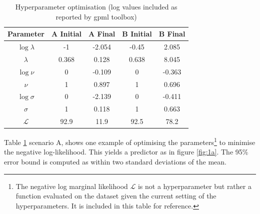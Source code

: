 \documentclass[]{article}
\newcommand{\Lcal}{\mathcal{L}}
\begin{document}
\begin{table}[!h]
\centering
\begin{tabular}{c | c c | c c}
	\textbf{Parameter} & \textbf{A Initial} & \textbf{A Final} & \textbf{B Initial} & \textbf{B Final} \\ \hline
	$\log \lambda$           & -1                 & -2.054           & -0.45              & 2.085            \\
	$\lambda$                & 0.368              & 0.128            & 0.638              & 8.045            \\
	$\log \nu$         & 0                  & -0.109           & 0                  & -0.363           \\
	$\nu$              & 1                  & 0.897            & 1                  & 0.696            \\
	$\log \sigma$      & 0                  & -2.139           & 0                  & -0.411   \\
	$\sigma$           & 1                  & 0.118            & 1                  & 0.663    \\ \hline
	$\Lcal$            & 92.9               & 11.9             & 92.5               & 78.2  
\end{tabular}
\caption{Hyperparameter optimisation (log values included as reported by gpml toolbox)}
\label{tab:hyp-opt}
\end{table}

Table \ref{tab:hyp-opt} scenario A, shows one example of optimising the parameters\footnote{The negative log marginal likelihood $\Lcal$ is not a hyperparameter but rather a function evaluated on the dataset given the current setting of the hyperparameters. It is included in this table for reference.} to minimise the negative log-likelihood. This yields a predictor as in figure \ref{fig:1a}. The 95\% error bound is computed as within two standard deviations of the mean.
\end{document}
